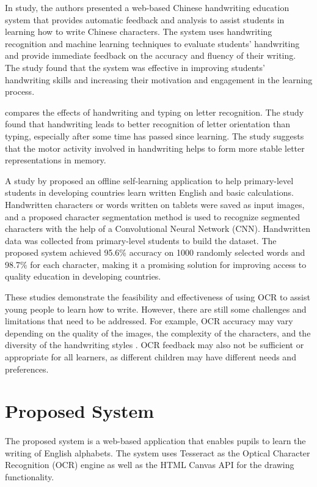 \documentclass[twocolumn,oneside,12pt,a4paper]{article}
\begin{document}
In \cite{tang_web-based_2006} study, the authors presented a web-based Chinese handwriting education system that provides automatic feedback and analysis to assist students in learning how to write Chinese characters. The system uses handwriting recognition and machine learning techniques to evaluate students' handwriting and provide immediate feedback on the accuracy and fluency of their writing. The study found that the system was effective in improving students' handwriting skills and increasing their motivation and engagement in the learning process.

\cite{longcamp_remembering_2006} compares the effects of handwriting and typing on letter recognition. The study found that handwriting leads to better recognition of letter orientation than typing, especially after some time has passed since learning. The study suggests that the motor activity involved in handwriting helps to form more stable letter representations in memory.

A study by \cite{zin_handwritten_2021} proposed an offline self-learning application to help primary-level students in developing countries learn written English and basic calculations. Handwritten characters or words written on tablets were saved as input images, and a proposed character segmentation method is used to recognize segmented characters with the help of a Convolutional Neural Network (CNN). Handwritten data was collected from primary-level students to build the dataset. The proposed system achieved 95.6\% accuracy on 1000 randomly selected words and 98.7\% for each character, making it a promising solution for improving access to quality education in developing countries.

These studies demonstrate the feasibility and effectiveness of using OCR to assist young people to learn how to write. However, there are still some challenges and limitations that need to be addressed. For example, OCR accuracy may vary depending on the quality of the images, the complexity of the characters, and the diversity of the handwriting styles \cite{asad_high_2016,faizullah_survey_2023,ye_document_2013}. OCR feedback may also not be sufficient or appropriate for all learners, as different children may have different needs and preferences.

\section{Proposed System}
\paragraph*{}
The proposed system is a web-based application that enables pupils to learn the writing of English alphabets. The system uses Tesseract \cite{smith_overview_2007} as the Optical Character Recognition (OCR) engine as well as the HTML Canvas API for the drawing functionality.
\end{document}
